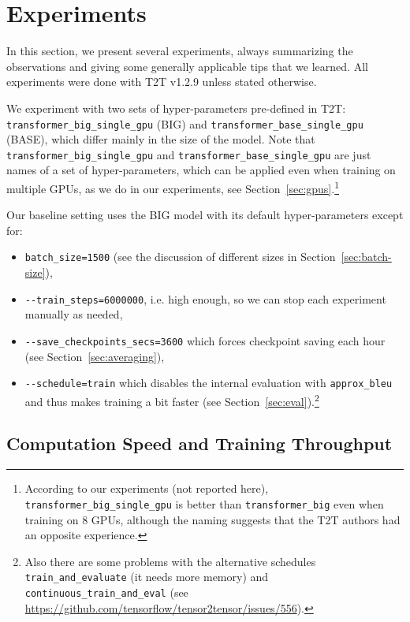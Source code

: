 \documentclass{pbmlarxiv} \pdfoutput=1
\def\Sref#1{Section~\ref{#1}}
\begin{document}
\section{Experiments}
\label{experiments}

In this section, we present several experiments, always summarizing the
 observations and giving some generally applicable tips that we learned.
All experiments were done with T2T v1.2.9 unless stated otherwise.

We experiment with two sets of hyper-parameters pre-defined in T2T:
 \texttt{trans\-for\-mer\_big\_sin\-gle\_gpu} (BIG) and \texttt{trans\-for\-mer\_ba\-se\_sin\-gle\_gpu} (BASE),
 which differ mainly in the size of the model.
Note that \texttt{trans\-for\-mer\_big\_sin\-gle\_gpu} and \texttt{trans\-for\-mer\_ba\-se\_sin\-gle\_gpu}
 are just names of a set of hyper-parameters,
 which can be applied even when training on multiple GPUs, as we do in our experiments, see Section~\ref{sec:gpus}.\footnote{
  According to our experiments (not reported here),
   \texttt{trans\-for\-mer\_big\_sin\-gle\_gpu} is better than \texttt{trans\-for\-mer\_big}
   even when training on 8 GPUs,
   although the naming suggests that the T2T authors had an opposite experience.
}

Our baseline setting uses the BIG model with its default hyper-parameters except
for:
\begin{itemize}
\item \verb|batch_size=1500| (see the discussion of different sizes in
\Sref{sec:batch-size}),
\item \verb|--train_steps=6000000|, i.e. high enough, so we can stop each
experiment manually as needed,
\item \verb|--save_checkpoints_secs=3600| which forces checkpoint saving each
hour (see \Sref{sec:averaging}),
\item \verb|--schedule=train| which disables the internal evaluation with \verb|approx_bleu|
      and thus makes training a bit faster (see \Sref{sec:eval}).\cprotect\footnote{%
      Also there are some problems with the alternative schedules
        \verb|train_and_evaluate| (it needs more memory) and \verb|continuous_train_and_eval|
        (see \url{https://github.com/tensorflow/tensor2tensor/issues/556}).
      }
\end{itemize}


\subsection{Computation Speed and Training Throughput}
\label{sec:computation-speed}
\end{document}
